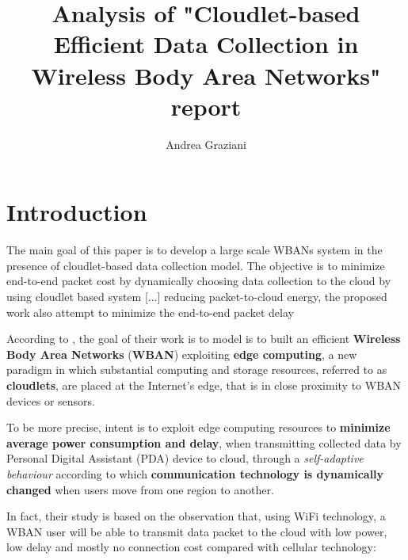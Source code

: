 \documentclass[sigchi]{acmart}
\begin{document}
\title{Analysis of "Cloudlet-based Efficient Data Collection in Wireless Body Area Networks" report}

\author{Andrea Graziani}

\renewcommand{\shortauthors}{Andrea Graziani (0273395)}

\maketitle

\section{Introduction}

\vspace{0.3cm}

\begin{quoting}[font=itshape, begintext={``}, endtext={''\cite[par.~1.4]{MSAReport}}]
The main goal of this paper is to develop a large scale WBANs system in the presence of cloudlet-based data collection model. The objective is to minimize end-to-end packet cost by dynamically choosing data collection to the cloud by using cloudlet based system [...] reducing packet-to-cloud energy, the proposed work also attempt to minimize the end-to-end packet delay
\end{quoting}

\vspace{0.3cm}

According to \citet{MSAReport}, the goal of their work is to model is to built an efficient \textbf{Wireless Body Area Networks} (\textbf{WBAN}) exploiting \textbf{edge computing}, a new paradigm in which substantial computing and storage resources, referred to as \textbf{cloudlets}, are placed at the Internet's edge, that is in close proximity to WBAN devices or sensors.\cite{TheEmergenceOfEdgeComputing}

To be more precise, \citet{MSAReport} intent is to exploit edge computing resources to \textbf{minimize average power consumption and delay}, when transmitting collected data by Personal Digital Assistant (PDA) device to cloud, through a \textit{self-adaptive behaviour} according to which \textbf{communication technology is dynamically changed} when users move from one region to another. 

In fact, their study is based on the observation that, using WiFi technology, a WBAN user will be able to transmit data packet to the cloud with low power, low delay and mostly no connection cost compared with cellular technology:
\end{document}
